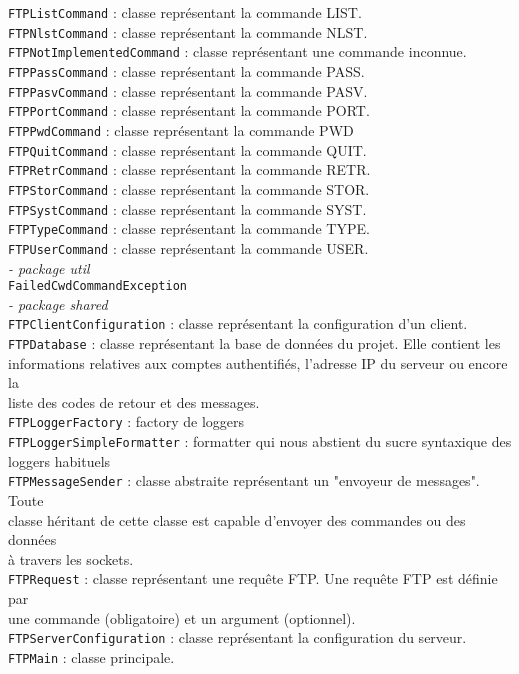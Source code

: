 \begin{tabbing}
			\>\>\>\verb+FTPListCommand+ : classe représentant la commande LIST.\\
			\>\>\>\verb+FTPNlstCommand+ : classe représentant la commande NLST.\\
			\>\>\>\verb+FTPNotImplementedCommand+ : classe représentant une commande inconnue.\\
			\>\>\>\verb+FTPPassCommand+ : classe représentant la commande PASS.\\
			\>\>\>\verb+FTPPasvCommand+ : classe représentant la commande PASV.\\
			\>\>\>\verb+FTPPortCommand+ : classe représentant la commande PORT.\\
			\>\>\>\verb+FTPPwdCommand+ : classe représentant la commande PWD\\
			\>\>\>\verb+FTPQuitCommand+ : classe représentant la commande QUIT.\\
			\>\>\>\verb+FTPRetrCommand+ : classe représentant la commande RETR.\\
			\>\>\>\verb+FTPStorCommand+ : classe représentant la commande STOR.\\
			\>\>\>\verb+FTPSystCommand+ : classe représentant la commande SYST.\\
			\>\>\>\verb+FTPTypeCommand+ : classe représentant la commande TYPE.\\
			\>\>\>\verb+FTPUserCommand+ : classe représentant la commande USER.\\
		\>\>\textit{- package util}\\
			\>\>\>\verb+FailedCwdCommandException+\\
		\>\textit{- package shared}\\
		\>\>\verb+FTPClientConfiguration+ : classe représentant la configuration d'un client.\\
		\>\>\verb+FTPDatabase+ : classe représentant la base de données du projet. Elle contient les \\\>\>informations relatives aux comptes authentifiés, l'adresse IP du serveur ou encore la \\\>\>liste des codes de retour et des messages.\\
		\>\>\verb+FTPLoggerFactory+ : factory de loggers\\
		\>\>\verb+FTPLoggerSimpleFormatter+ : formatter qui nous abstient du sucre syntaxique des \\\>\>loggers habituels\\
		\>\>\verb+FTPMessageSender+ : classe abstraite représentant un "envoyeur de messages". Toute \\\>\>classe héritant de cette classe est capable d'envoyer des commandes ou des données \\\>\>à travers les sockets.\\
		\>\>\verb+FTPRequest+ : classe représentant une requête FTP. Une requête FTP est définie par \\\>\>une commande (obligatoire) et un argument (optionnel).\\
		\>\>\verb+FTPServerConfiguration+ : classe représentant la configuration du serveur.\\
	\>\verb+FTPMain+ : classe principale.\\
\end{tabbing}
